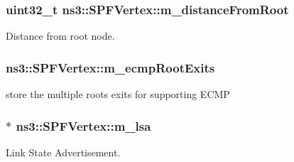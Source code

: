 \subsubsection[{\texorpdfstring{m\+\_\+distance\+From\+Root}{m_distanceFromRoot}}]{\setlength{\rightskip}{0pt plus 5cm}uint32\+\_\+t ns3\+::\+S\+P\+F\+Vertex\+::m\+\_\+distance\+From\+Root\hspace{0.3cm}{\ttfamily [private]}}\hypertarget{classns3_1_1SPFVertex_ab4e836176a21fc534eec7ca0b382caa6}{}\label{classns3_1_1SPFVertex_ab4e836176a21fc534eec7ca0b382caa6}


Distance from root node. 

\subsubsection[{\texorpdfstring{m\+\_\+ecmp\+Root\+Exits}{m_ecmpRootExits}}]{ ns3\+::\+S\+P\+F\+Vertex\+::m\+\_\+ecmp\+Root\+Exits\hspace{0.3cm}{\ttfamily [private]}}\hypertarget{classns3_1_1SPFVertex_af019baf41705f205801379189ada7085}{}\label{classns3_1_1SPFVertex_af019baf41705f205801379189ada7085}


store the multiple root\textquotesingle{}s exits for supporting E\+C\+MP 

\subsubsection[{\texorpdfstring{m\+\_\+lsa}{m_lsa}}]{$\ast$ ns3\+::\+S\+P\+F\+Vertex\+::m\+\_\+lsa\hspace{0.3cm}{\ttfamily [private]}}\hypertarget{classns3_1_1SPFVertex_a5f64e98f7b9df501b92b454c471ea861}{}\label{classns3_1_1SPFVertex_a5f64e98f7b9df501b92b454c471ea861}


Link State Advertisement. 

